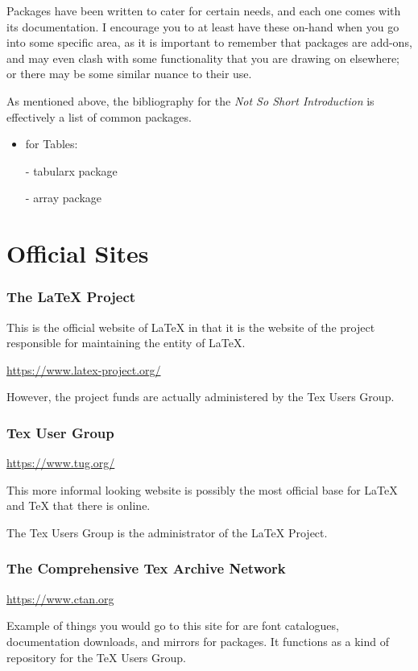 \documentclass[11pt, oneside]{memoir}
\begin{document}
Packages have been written to cater for certain needs, and each one comes with its documentation. I encourage you to at least have these on-hand when you go into some specific area, as it is important to remember that packages are add-ons, and may even clash with some functionality that you are drawing on elsewhere; or there may be some similar nuance to their use.

As mentioned above, the bibliography for the \emph{Not So Short Introduction} is effectively a list of common packages.

\begin{itemize}
    \item for Tables:
    \item[-] tabularx package
    \item[-] array package
\end{itemize}

\chapter{Official Sites}

\subsection{The LaTeX Project}

This is the official website of LaTeX in that it is the website of the project responsible for maintaining the entity of LaTeX.

\url{https://www.latex-project.org/}

However, the project funds are actually administered by the Tex Users Group.

\subsection{Tex User Group}

\url{https://www.tug.org/}

This more informal looking website is possibly the most official base for LaTeX and TeX that there is online. 

The Tex Users Group is the administrator of the LaTeX Project.

\subsection{The Comprehensive Tex Archive Network}
\url{https://www.ctan.org}

Example of things you would go to this site for are font catalogues, documentation downloads, and mirrors for packages. It functions as a kind of repository for the TeX Users Group.
\end{document}
